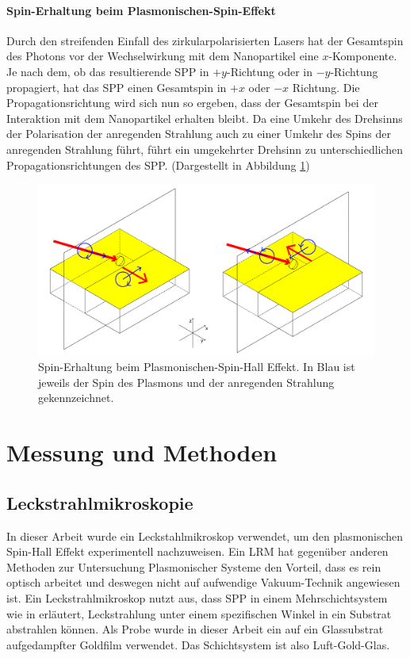 \documentclass[titlepage]{article}
\begin{document}
	\paragraph{Spin-Erhaltung beim Plasmonischen-Spin-Effekt}
	Durch den streifenden Einfall des zirkularpolarisierten Lasers hat der Gesamtspin des Photons vor der Wechselwirkung mit dem Nanopartikel eine $x$-Komponente. Je nach dem, ob das resultierende SPP in $+y$-Richtung oder in $-y$-Richtung propagiert, hat das SPP einen Gesamtspin in  $+x$ oder $-x$ Richtung. Die Propagationsrichtung wird sich nun so ergeben, dass der Gesamtspin bei der Interaktion mit dem Nanopartikel erhalten bleibt. Da eine Umkehr des Drehsinns der Polarisation der anregenden Strahlung auch zu einer Umkehr des Spins der anregenden Strahlung führt, führt ein umgekehrter Drehsinn zu unterschiedlichen Propagationsrichtungen des SPP. (Dargestellt in Abbildung \ref{fig:spin_hall_schema})
	\begin{figure}[h]
		\centering
		\includegraphics[width=1.0\linewidth]{figures/spin_hall_schema.pdf}
		\caption{Spin-Erhaltung beim Plasmonischen-Spin-Hall Effekt. In Blau ist jeweils der Spin des Plasmons und der anregenden Strahlung gekennzeichnet.}
		\label{fig:spin_hall_schema}
	\end{figure}
	
	
	
	\section{Messung und Methoden}
	\subsection{Leckstrahlmikroskopie}
	In dieser Arbeit wurde ein Leckstahlmikroskop verwendet, um den plasmonischen Spin-Hall Effekt experimentell nachzuweisen. Ein LRM hat gegenüber anderen Methoden zur Untersuchung Plasmonischer Systeme den Vorteil, dass es rein optisch arbeitet und deswegen nicht auf aufwendige Vakuum-Technik angewiesen ist. Ein Leckstrahlmikroskop nutzt aus, dass SPP in einem Mehrschichtsystem wie in  erläutert, Leckstrahlung unter einem spezifischen Winkel in ein Substrat abstrahlen können. Als Probe wurde in dieser Arbeit ein auf ein Glassubstrat aufgedampfter Goldfilm verwendet. Das Schichtsystem ist also Luft-Gold-Glas.
	
\end{document}
